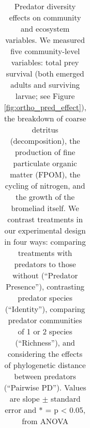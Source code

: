 \documentclass[11pt]{article}
\begin{document}
\begin{table}[h]
\caption{Predator diversity effects on community and ecosystem
variables. We measured five community-level variables: total prey
survival (both emerged adults and surviving larvae; see Figure \ref{fig:ortho_pred_effect}), the
breakdown of coarse detritus (decomposition), the production of fine
particulate organic matter (FPOM), the cycling of nitrogen, and the
growth of the bromeliad itself. We contrast treatments in our
experimental design in four ways: comparing treatments with predators to
those without (``Predator Presence''), contrasting predator species
(``Identity''), comparing predator communities of 1 or 2 species
(``Richness''), and considering the effects of phylogenetic distance
between predators (``Pairwise PD''). Values are slope $\pm$ standard error
and * = p \textless{} 0.05, from ANOVA}
\label{tab:pdeffects}
\centering
\begin{tabular}{rrrrr}


\end{tabular}
\end{table}
\end{document}
